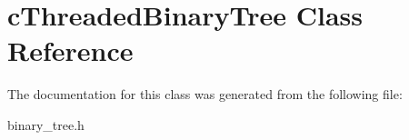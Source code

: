 \hypertarget{classcThreadedBinaryTree}{\section{c\-Threaded\-Binary\-Tree \-Class \-Reference}
\label{classcThreadedBinaryTree}
}


\-The documentation for this class was generated from the following file\-:\begin{DoxyCompactItemize}
\item 
binary\-\_\-tree.\-h\end{DoxyCompactItemize}
